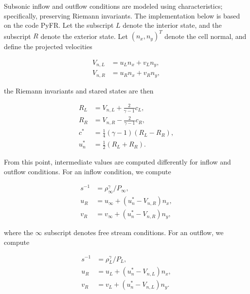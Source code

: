 \documentclass{article}
\begin{document}
Subsonic inflow and outflow conditions are modeled using characteristics; specifically, preserving Riemann invariants. The implementation below is based on the code PyFR. Let the subscript $L$ denote the interior state, and the subscript $R$ denote the exterior state. Let $(n_x,n_y)^T$ denote the cell normal, and define the projected velocities

\begin{equation}
\begin{aligned}
V_{n,L} &= u_Ln_x + v_Ln_y, \\
V_{n,R} &= u_Rn_x + v_Rn_y,
\end{aligned}
\end{equation}

the Riemann invariants and stared states are then

\begin{equation}
\begin{aligned}
R_L &= V_{n,L} + \frac{2}{\gamma-1}c_L, \\
R_R &= V_{n,R} - \frac{2}{\gamma-1}c_R, \\
c^* &= \frac{1}{4}(\gamma-1)(R_L-R_R), \\
u_n^* &= \frac{1}{2}(R_L+R_R).
\end{aligned}
\end{equation}

From this point, intermediate values are computed differently for inflow and outflow conditions. For an inflow condition, we compute

\begin{equation}
\begin{aligned}
s^{-1} &= \rho_{\infty}^{\gamma}/P_{\infty}, \\
u_R &= u_{\infty} + (u_n^*-V_{n,R})n_x, \\
v_R &= v_{\infty} + (u_n^*-V_{n,R})n_y,
\end{aligned}
\end{equation}

where the $\infty$ subscript denotes free stream conditions. For an outflow, we compute

\begin{equation}
\begin{aligned}
s^{-1} &= \rho_L^{\gamma}/P_L, \\
u_R &= u_L + (u_n^*-V_{n,L})n_x, \\
v_R &= v_L + (u_n^*-V_{n,L})n_y.
\end{aligned}
\end{equation}
\end{document}
